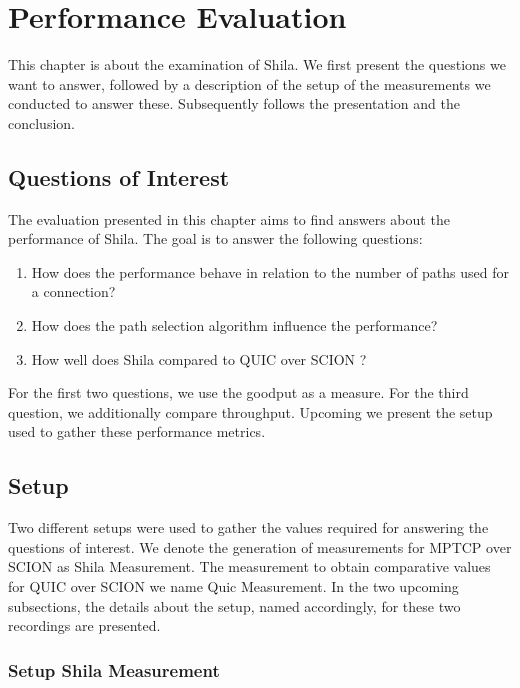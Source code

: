 \chapter{Performance Evaluation}
\label{chap:PerformanceEvaluation}

This chapter is about the examination of Shila. We first present the questions we want to answer, followed by a description of the setup of the measurements we conducted to answer these. Subsequently follows the presentation and the conclusion.

\section{Questions of Interest}
\label{sec:QuestionsOfInterest}

The evaluation presented in this chapter aims to find answers about the performance of Shila. The goal is to answer the following questions:

{\small \begin{enumerate}
	\item How does the performance behave in relation to the number of paths used for a connection?
	\item How does the path selection algorithm influence the performance?
	\item How well does Shila compared to QUIC over SCION \cite{bibid}?
\end{enumerate}}

For the first two questions, we use the goodput as a measure. For the third question, we additionally compare throughput. Upcoming we present the setup used to gather these performance metrics.

\section{Setup}
\label{subsec:Setup}

Two different setups were used to gather the values required for answering the questions of interest. We denote the generation of measurements for MPTCP over SCION as Shila Measurement. The measurement to obtain comparative values for QUIC over SCION we name Quic Measurement. In the two upcoming subsections, the details about the setup, named accordingly, for these two recordings are presented.

\subsection*{Setup Shila Measurement} 

